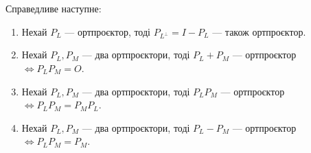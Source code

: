 \documentclass{math_library}
\begin{document}
\begin{proposition}
Справедливе наступне:
\begin{enumerate}[nosep,wide=0pt,label={\arabic*)}]
\item Нехай $P_L$ --- ортпроєктор, тоді $P_{L^{\perp}} = I - P_L$ --- також ортпроєктор.
\item Нехай $P_L, P_M$ --- два ортпроєктори, тоді $P_L + P_M$ --- ортпроєктор $\iff P_L P_M = O$.
\item Нехай $P_L, P_M$ --- два ортпроєктори, тоді $P_L P_M$ --- ортпроєктор $\iff P_L P_M = P_M P_L$.
\item Нехай $P_L, P_M$ --- два ортпроєктори, тоді $P_L - P_M$ --- ортпроєктор $\iff P_L P_M = P_M$.
\end{enumerate}
\end{proposition}
\end{document}
